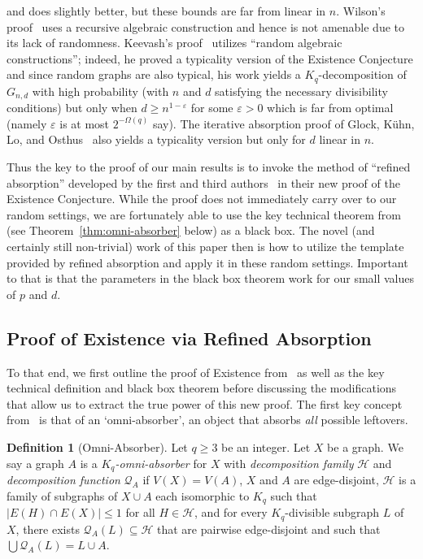 \documentclass[11pt]{article}
\numberwithin{equation}{section}
\newcounter{i}
\theoremstyle{plain}
\theoremstyle{plain} %
\theoremstyle{definition}
\newtheorem{definition}[thm]{Definition}
\begin{document}
and \cite{KKMO23} does slightly better, but these bounds are far from linear in $n$.
Wilson's proof~\cite{WiI,WiII,WiIII} uses a recursive algebraic construction and hence is not amenable due to its lack of randomness. 
Keevash's proof~\cite{K14} utilizes ``random algebraic constructions''; indeed, he proved a typicality version of the Existence Conjecture and since random graphs are also typical, his work yields a $K_q$-decomposition of $G_{n,d}$ with high probability (with $n$ and $d$ satisfying the necessary divisibility conditions) but only when $d\ge n^{1-\varepsilon}$ for some $\varepsilon > 0$ which is far from optimal (namely $\varepsilon$ is at most $2^{-\Omega(q)}$ say). The iterative absorption proof of Glock, K\"uhn, Lo, and Osthus~\cite{GKLO16} also yields a typicality version but only for $d$ linear in $n$.

Thus the key to the proof of our main results is to invoke the method of ``refined absorption'' developed by the first and third authors~\cite{DPI} in their new proof of the Existence Conjecture. While the proof does not immediately carry over to our random settings, we are fortunately able to use the key technical theorem from~\cite{DPI} (see Theorem~\ref{thm:omni-absorber} below) as a black box. The novel (and certainly still non-trivial) work of this paper then is how to utilize the template provided by refined absorption and apply it in these random settings. Important to that is that the parameters in the black box theorem work for our small values of $p$ and $d$.  

\subsection{Proof of Existence via Refined Absorption}

To that end, we first outline the proof of Existence from~\cite{DPI} as well as the key technical definition and black box theorem before discussing the modifications that allow us to extract the true power of this new proof. The first key concept from~\cite{DPI} is that of an `omni-absorber', an object that absorbs \emph{all} possible leftovers.

\begin{definition}[Omni-Absorber]
Let $q \geq 3$ be an integer. Let $X$ be a graph. We say a graph $A$ is a \textit{$K_q$-omni-absorber} for $X$ with \emph{decomposition family} $\mathcal{H}$ and \emph{decomposition function} $\mathcal{Q}_A$ if $V(X)=V(A)$, $X$ and $A$ are edge-disjoint, $\mathcal{H}$ is a family of subgraphs of $X\cup A$ each isomorphic to $K_q$ such that $|E(H)\cap E(X)|\le 1$ for all $H\in\mathcal{H}$, and for every $K_q$-divisible subgraph $L$ of $X$, there exists $\mathcal{Q}_A(L)\subseteq \mathcal{H}$ that are pairwise edge-disjoint and such that $\bigcup \mathcal{Q}_A(L)=L\cup A$. 
\end{definition}
\end{document}

